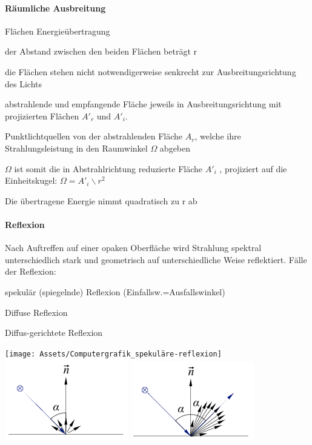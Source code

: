 \documentclass[landscape]{article}
\begin{document}
\begin{multicols}{3}
  \paragraph{Räumliche Ausbreitung}
  Flächen Energieübertragung
  \begin{itemize*}
    \item der Abstand zwischen den beiden Flächen beträgt r
    \item die Flächen stehen nicht notwendigerweise senkrecht zur Ausbreitungsrichtung des Lichts
    \item abstrahlende und empfangende Fläche jeweils in Ausbreitungsrichtung mit projizierten Flächen $A'_r$ und $A'_i$.
    \item Punktlichtquellen von der abstrahlenden Fläche $A_r$, welche ihre Strahlungsleistung in den Raumwinkel $\Omega$ abgeben
    \item $\Omega$ ist somit die in Abstrahlrichtung reduzierte Fläche $A'_i$ , projiziert auf die Einheitskugel: $\Omega=A'_i \backslash r^2$
    \item Die übertragene Energie nimmt quadratisch zu r ab
  \end{itemize*}
  
  \paragraph{Reflexion}
  Nach Auftreffen auf einer opaken Oberfläche wird Strahlung spektral unterschiedlich stark und geometrisch auf unterschiedliche Weise reflektiert. 
  Fälle der Reflexion:
  \begin{itemize*}
    \item spekulär (spiegelnde) Reflexion (Einfallsw.=Ausfallswinkel)
    \item Diffuse Reflexion
    \item Diffus-gerichtete Reflexion
  \end{itemize*}
  \begin{center}
    \texttt{[image: Assets/Computergrafik\_spekuläre-reflexion]}
    \includegraphics[width=0.3\linewidth]{Assets/Computergrafik_diffuse-reflexion}
    \includegraphics[width=0.3\linewidth]{Assets/Computergrafik_diffus-gerichtete-reflexion}
  \end{center}
  

\end{multicols}
\end{document}
